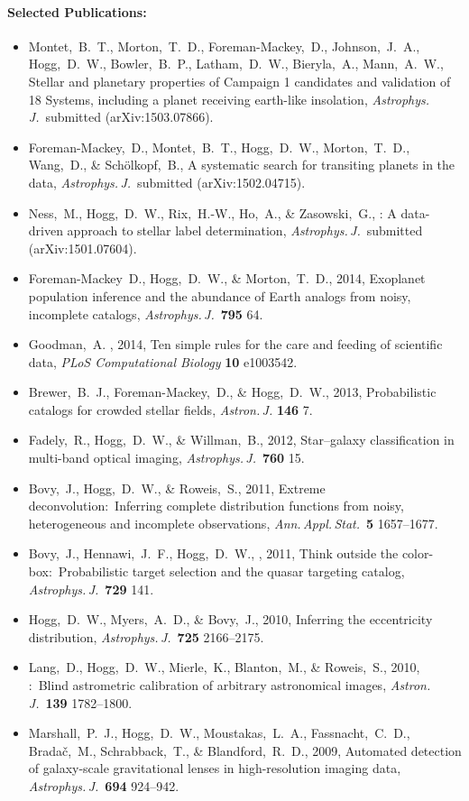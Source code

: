 \documentclass[12pt]{article}
\begin{document}
\paragraph{Selected Publications:}
\begin{itemize}\setlength{\itemsep}{0pt}
\item
Montet,~B.~T., Morton,~T.~D., Foreman-Mackey,~D., Johnson,~J.~A.,
Hogg,~D.~W., Bowler,~B.~P., Latham,~D.~W., Bieryla,~A., Mann,~A.~W.,
{Stellar and planetary properties of  Campaign 1
  candidates and validation of 18 Systems, including a planet
  receiving earth-like insolation},
\textit{Astrophys.\,J.}\ submitted (arXiv:1503.07866).
\item
Foreman-Mackey,~D., Montet,~B.~T., Hogg,~D.~W., Morton,~T.~D., Wang,~D., \& Sch\"olkopf,~B.,
{A systematic search for transiting planets in the  data},
\textit{Astrophys.\,J.}\ submitted (arXiv:1502.04715).
\item
Ness,~M., Hogg,~D.~W., Rix,~H.-W., Ho,~A., \& Zasowski,~G.,
{: A data-driven approach to stellar label determination},
\textit{Astrophys.\,J.}\ submitted (arXiv:1501.07604).
\item
Foreman-Mackey~D., Hogg,~D.~W., \& Morton,~T.~D., 2014,
{Exoplanet population inference and the abundance of Earth analogs from noisy, incomplete catalogs},
\textit{Astrophys.\,J.}\ \textbf{795} 64.
\item
Goodman,~A. \etal, 2014,
{Ten simple rules for the care and feeding of scientific data},
\textit{PLoS Computational Biology} \textbf{10} e1003542.
\item
Brewer,~B.~J., Foreman-Mackey,~D., \& Hogg,~D.~W., 2013,
{Probabilistic catalogs for crowded stellar fields},
\textit{Astron.\,J.} \textbf{146} 7.
\item
Fadely,~R., Hogg,~D.~W., \& Willman,~B., 2012,
{Star--galaxy classification in multi-band optical imaging},
\textit{Astrophys.\,J.}\ \textbf{760} 15.
\item
Bovy,~J., Hogg,~D.~W., \& Roweis,~S., 2011,
{Extreme deconvolution:\ Inferring complete distribution functions from noisy, heterogeneous and incomplete observations},
\textit{Ann.\,Appl.\,Stat.}\ \textbf{5} 1657--1677.
\item
Bovy,~J., Hennawi,~J.~F., Hogg,~D.~W., \etal, 2011,
{Think outside the color-box:\ Probabilistic target selection and the  quasar targeting catalog},
\textit{Astrophys.\,J.}\ \textbf{729} 141.
\item
Hogg,~D.~W., Myers,~A.~D., \& Bovy,~J., 2010,
{Inferring the eccentricity distribution},
\textit{Astrophys.\,J.}\ \textbf{725} 2166--2175.
\item
Lang,~D., Hogg,~D.~W., Mierle,~K., Blanton,~M., \& Roweis,~S., 2010,
{:\ Blind astrometric calibration of arbitrary astronomical images},
\textit{Astron.\,J.}\ \textbf{139} 1782--1800.
\item
Marshall,~P.~J., Hogg,~D.~W., Moustakas,~L.~A., Fassnacht,~C.~D.,
Brada\v{c},~M., Schrabback,~T., \& Blandford,~R.~D., 2009,
{Automated detection of galaxy-scale gravitational lenses in high-resolution imaging data},
\textit{Astrophys.\,J.}\ \textbf{694} 924--942.
\end{itemize}
\end{document}
